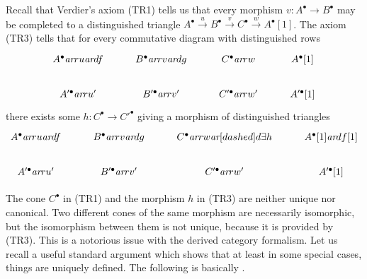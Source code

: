 \documentclass[leqno,12pt]{article}
\theoremstyle{plain}
\theoremstyle{definition}
\newcommand{\ar}{\text{\it ar}}
\begin{document}
Recall that Verdier's axiom (TR1) tells us that every morphism
$v\colon A^\bullet \to B^\bullet$ may be completed to a distinguished triangle
$A^\bullet \xrightarrow{u} B^\bullet \xrightarrow{v} C^\bullet \xrightarrow{w} A^\bullet [1]$.
The axiom (TR3) tells that for every commutative diagram with
distinguished rows
\begin{equation}
  \label{eqn:TR3-input}
  \begin{tikzcd}
    A^\bullet\ar{r}{u}\ar{d}{f} & B^\bullet\ar{r}{v}\ar{d}{g} & C^\bullet\ar{r}{w} & A^\bullet [1] \\
    A'^\bullet\ar{r}{u'} & B'^\bullet\ar{r}{v'} & C'^\bullet\ar{r}{w'} & A'^\bullet [1]
  \end{tikzcd}
\end{equation}
there exists some $h\colon C^\bullet \to C'^\bullet$ giving a morphism of
distinguished triangles
\begin{equation}
  \label{eqn:TR3-output}
  \begin{tikzcd}
    A^\bullet\ar{r}{u}\ar{d}{f} & B^\bullet\ar{r}{v}\ar{d}{g} & C^\bullet\ar{r}{w}\ar[dashed]{d}{\exists h} & A^\bullet [1]\ar{d}{f [1]} \\
    A'^\bullet\ar{r}{u'} & B'^\bullet\ar{r}{v'} & C'^\bullet\ar{r}{w'} & A'^\bullet [1]
  \end{tikzcd}
\end{equation}

The cone $C^\bullet$ in (TR1) and the morphism $h$ in (TR3) are neither unique
nor canonical. Two different cones of the same morphism are necessarily
isomorphic, but the isomorphism between them is not unique, because it is
provided by (TR3). This is a notorious issue with the derived category
formalism. Let us recall a useful standard argument which shows that at least in
some special cases, things are uniquely defined. The following is basically
\cite[Proposition~1.1.9, Corollaire~1.1.10]{Beilinson-Bernstein-Deligne}.
\end{document}
